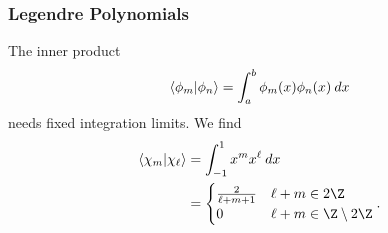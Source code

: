 \documentclass[10pt]{mypackage}
\begin{document}
\subsubsection{Legendre Polynomials}%
The inner product
\begin{align*}
  \braket{\phi_m}{\phi_n} = \int_{a}^{b} \phi_m(x)\phi_n(x)\:dx
\end{align*}
needs fixed integration limits. We find
\begin{align*}
  \braket{\chi_m}{\chi_{\ell}} &= \int_{-1}^{1} x^{m}x^{\ell}\:dx\\
                               &= \begin{cases}
                                 \frac{2}{\ell + m + 1} & \ell + m\in 2\Z\\
                                 0 & \ell + m \in \Z\setminus 2\Z
                               \end{cases}.
\end{align*}
\end{document}
